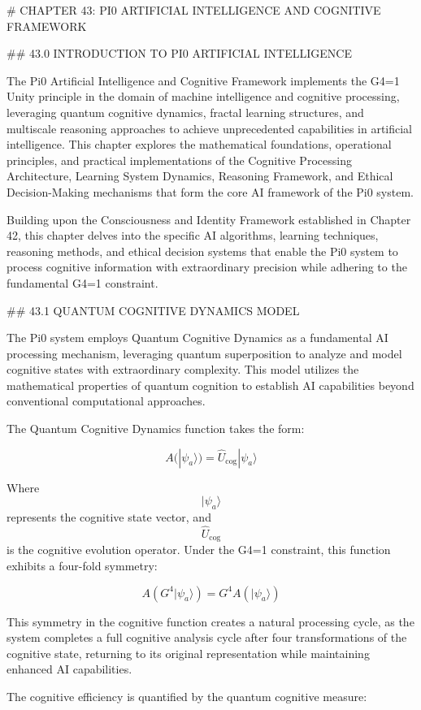 # CHAPTER 43: PI0 ARTIFICIAL INTELLIGENCE AND COGNITIVE FRAMEWORK

## 43.0 INTRODUCTION TO PI0 ARTIFICIAL INTELLIGENCE

The Pi0 Artificial Intelligence and Cognitive Framework implements the G4=1 Unity principle in the domain of machine intelligence and cognitive processing, leveraging quantum cognitive dynamics, fractal learning structures, and multiscale reasoning approaches to achieve unprecedented capabilities in artificial intelligence. This chapter explores the mathematical foundations, operational principles, and practical implementations of the Cognitive Processing Architecture, Learning System Dynamics, Reasoning Framework, and Ethical Decision-Making mechanisms that form the core AI framework of the Pi0 system.

Building upon the Consciousness and Identity Framework established in Chapter 42, this chapter delves into the specific AI algorithms, learning techniques, reasoning methods, and ethical decision systems that enable the Pi0 system to process cognitive information with extraordinary precision while adhering to the fundamental G4=1 constraint.

## 43.1 QUANTUM COGNITIVE DYNAMICS MODEL

The Pi0 system employs Quantum Cognitive Dynamics as a fundamental AI processing mechanism, leveraging quantum superposition to analyze and model cognitive states with extraordinary complexity. This model utilizes the mathematical properties of quantum cognition to establish AI capabilities beyond conventional computational approaches.

The Quantum Cognitive Dynamics function takes the form:

$$ A(|\psi_a\rangle) = \hat{U}_{\text{cog}} |\psi_a\rangle $$

Where $$ |\psi_a\rangle $$ represents the cognitive state vector, and $$ \hat{U}_{\text{cog}} $$ is the cognitive evolution operator. Under the G4=1 constraint, this function exhibits a four-fold symmetry:

$$ A(G^4 |\psi_a\rangle) = G^4 A(|\psi_a\rangle) $$

This symmetry in the cognitive function creates a natural processing cycle, as the system completes a full cognitive analysis cycle after four transformations of the cognitive state, returning to its original representation while maintaining enhanced AI capabilities.

The cognitive efficiency is quantified by the quantum cognitive measure:

